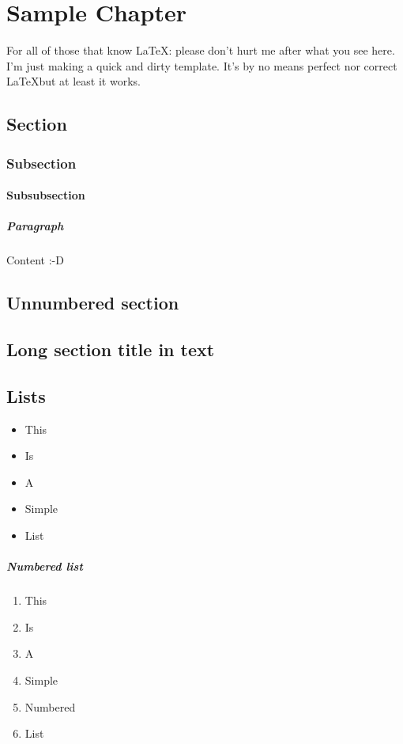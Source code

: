 \chapter{Sample Chapter}

For all of those that know \LaTeX: please don't hurt me after what you see here. I'm just making a quick and dirty template. It's by no means perfect nor correct \LaTeX but at least it works.

\section{Section}
\subsection{Subsection}
\subsubsection{Subsubsection}
\paragraph{Paragraph}
Content :-D

\section*{Unnumbered section}
\section[short section title]{Long section title in text}

\section{Lists}
\begin{itemize}
  \item This
  \item Is
  \item A
  \item Simple
  \item List
\end{itemize}

\paragraph{Numbered list}

\begin{enumerate}
  \item This
  \item Is
  \item A
  \item Simple
  \item Numbered
  \item List
\end{enumerate}


